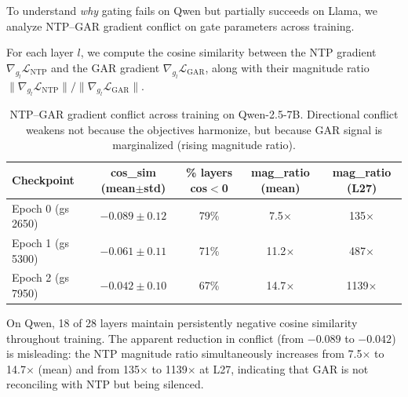 \documentclass[11pt,a4paper]{article}
\begin{document}
To understand \emph{why} gating fails on Qwen but partially succeeds on Llama, we analyze NTP--GAR gradient conflict on gate parameters across training.

For each layer $l$, we compute the cosine similarity between the NTP gradient $\nabla_{g_l}\mathcal{L}_{\text{NTP}}$ and the GAR gradient $\nabla_{g_l}\mathcal{L}_{\text{GAR}}$, along with their magnitude ratio $\|\nabla_{g_l}\mathcal{L}_{\text{NTP}}\| / \|\nabla_{g_l}\mathcal{L}_{\text{GAR}}\|$.

\begin{table}[h]
\centering
\small
\caption{NTP--GAR gradient conflict across training on Qwen-2.5-7B. Directional conflict weakens not because the objectives harmonize, but because GAR signal is marginalized (rising magnitude ratio).}
\label{tab:qwen_gradient}
\begin{tabular}{lcccc}
\toprule
\textbf{Checkpoint} & \textbf{cos\_sim (mean$\pm$std)} & \textbf{\% layers cos$<$0} & \textbf{mag\_ratio (mean)} & \textbf{mag\_ratio (L27)} \\
\midrule
Epoch 0 (gs 2650) & $-0.089 \pm 0.12$ & 79\% & 7.5$\times$ & 135$\times$ \\
Epoch 1 (gs 5300) & $-0.061 \pm 0.11$ & 71\% & 11.2$\times$ & 487$\times$ \\
Epoch 2 (gs 7950) & $-0.042 \pm 0.10$ & 67\% & 14.7$\times$ & 1139$\times$ \\
\bottomrule
\end{tabular}
\end{table}

On Qwen, 18 of 28 layers maintain persistently negative cosine similarity throughout training.
The apparent reduction in conflict (from $-0.089$ to $-0.042$) is misleading: the NTP magnitude ratio simultaneously increases from 7.5$\times$ to 14.7$\times$ (mean) and from 135$\times$ to 1139$\times$ at L27, indicating that GAR is not reconciling with NTP but being silenced.
\end{document}

